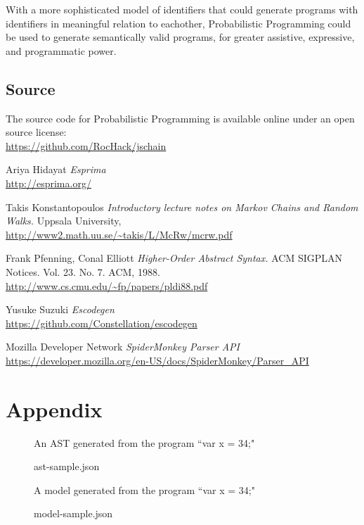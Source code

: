 \documentclass{article}
\begin{document}
With a more sophisticated model of identifiers that could generate programs with
identifiers in meaningful relation to eachother, Probabilistic Programming could
be used to generate semantically valid programs, for greater assistive,
expressive, and programmatic power.

\subsection{Source}

The source code for Probabilistic Programming is available online under an open
source license:\\
\url{https://github.com/RocHack/jschain}

\begin{thebibliography}{1}

	 Ariya Hidayat {\em Esprima}
		\\\url{http://esprima.org/}

	 Takis Konstantopoulos {\em Introductory lecture notes on
		Markov Chains and Random Walks.} Uppsala University,
		\\\url{http://www2.math.uu.se/~takis/L/McRw/mcrw.pdf}

	 Frank Pfenning, Conal Elliott
		{\em Higher-Order Abstract Syntax.}
		ACM SIGPLAN Notices. Vol. 23. No. 7. ACM, 1988.
		\\\url{http://www.cs.cmu.edu/~fp/papers/pldi88.pdf}

	 Yusuke Suzuki {\em Escodegen}
		\\\url{https://github.com/Constellation/escodegen}

	 Mozilla Developer Network {\em SpiderMonkey Parser API}
		\\\url{https://developer.mozilla.org/en-US/docs/SpiderMonkey/Parser_API}

\end{thebibliography}

\clearpage
\section*{Appendix}

\begin{figure}[h!]
	\caption{ast-sample.json}
	\label{fig:sample-ast}
	\centering
	An AST generated from the program ``var x = 34;"

	
\end{figure}

\begin{figure}[h!]
	\caption{model-sample.json}
	\label{fig:sample-model}
	\centering
	A model generated from the program ``var x = 34;"

	
\end{figure}
\end{document}
